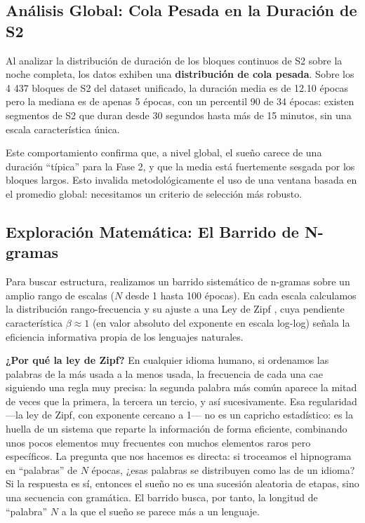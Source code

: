 \subsection{Análisis Global: Cola Pesada en la Duración de S2}

Al analizar la distribución de duración de los bloques continuos de S2 sobre la noche completa, los datos exhiben una \textbf{distribución de cola pesada}. Sobre los 4 437 bloques de S2 del dataset unificado, la duración media es de 12.10 épocas pero la mediana es de apenas 5 épocas, con un percentil 90 de 34 épocas: existen segmentos de S2 que duran desde 30 segundos hasta más de 15 minutos, sin una escala característica única.

Este comportamiento confirma que, a nivel global, el sueño carece de una duración ``típica'' para la Fase 2, y que la media está fuertemente sesgada por los bloques largos. Esto invalida metodológicamente el uso de una ventana basada en el promedio global: necesitamos un criterio de selección más robusto.

\subsection{Exploración Matemática: El Barrido de N-gramas}

Para buscar estructura, realizamos un barrido sistemático de n-gramas sobre un amplio rango de escalas ($N$ desde 1 hasta 100 épocas). En cada escala calculamos la distribución rango-frecuencia y su ajuste a una Ley de Zipf \cite{zipf1949human}, cuya pendiente característica $\beta \approx 1$ (en valor absoluto del exponente en escala log-log) señala la eficiencia informativa propia de los lenguajes naturales.

\textbf{¿Por qué la ley de Zipf?} En cualquier idioma humano, si ordenamos las palabras de la más usada a la menos usada, la frecuencia de cada una cae siguiendo una regla muy precisa: la segunda palabra más común aparece la mitad de veces que la primera, la tercera un tercio, y así sucesivamente. Esa regularidad ---la ley de Zipf, con exponente cercano a 1--- no es un capricho estadístico: es la huella de un sistema que reparte la información de forma eficiente, combinando unos pocos elementos muy frecuentes con muchos elementos raros pero específicos. La pregunta que nos hacemos es directa: si troceamos el hipnograma en ``palabras'' de $N$ épocas, ¿esas palabras se distribuyen como las de un idioma? Si la respuesta es sí, entonces el sueño no es una sucesión aleatoria de etapas, sino una secuencia con gramática. El barrido busca, por tanto, la longitud de ``palabra'' $N$ a la que el sueño se parece más a un lenguaje.

